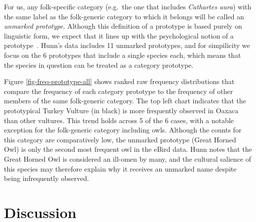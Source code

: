 \documentclass[10pt,letterpaper]{article}
\begin{document}
For us, any folk-specific category (e.g.\ the one that includes \emph{ Cathartes aura}) with the same label as the folk-generic category to which it belongs will be called an \emph{unmarked prototype}.  Although this definition of a prototype is based purely on linguistic form, we expect that it lines up with the psychological notion of a prototype~\cite{rosch73}. Hunn's data includes 11 unmarked prototypes, and for simpilicity we focus on the 6 prototypes that include a single species each, which means that the species in question can be treated as a category prototype.

Figure \ref{fig-freq-prototype-all} shows ranked raw frequency distributions that compare the frequency of each category prototype to the frequency of other members of the same folk-generic category. 
The top left chart indicates that the prototypical Turkey Vulture (in black) is more frequently observed in Oaxaca than other vultures. This trend holds across 5 of the 6 cases, with a notable exception for the folk-generic category including owls. Although the counts for this category are comparatively low, the unmarked prototype (Great Horned Owl) is only the second most frequent owl in the eBird data. Hunn notes that the Great Horned Owl is considered an ill-omen by many, and the cultural salience of this species may therefore explain why it receives an unmarked name despite being infrequently observed. 




\section{Discussion}


\end{document}
